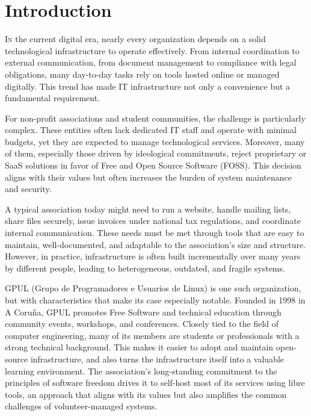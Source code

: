 %

\chapter{Introduction}
\label{chap:introducion}

\lettrine{I}{n} the current digital era, nearly every organization depends on a solid technological infrastructure to operate effectively. From internal coordination to external communication, from document management to compliance with legal obligations, many day-to-day tasks rely on tools hosted online or managed digitally. This trend has made IT infrastructure not only a convenience but a fundamental requirement.

For non-profit associations and student communities, the challenge is particularly complex. These entities often lack dedicated IT staff and operate with minimal budgets, yet they are expected to manage technological services. Moreover, many of them, especially those driven by ideological commitments, reject proprietary or SaaS solutions in favor of Free and Open Source Software (FOSS). This decision aligns with their values but often increases the burden of system maintenance and security.

A typical association today might need to run a website, handle mailing lists, share files securely, issue invoices under national tax regulations, and coordinate internal communication. These needs must be met through tools that are easy to maintain, well-documented, and adaptable to the association's size and structure. However, in practice, infrastructure is often built incrementally over many years by different people, leading to heterogeneous, outdated, and fragile systems.

GPUL (Grupo de Programadores e Usuarios de Linux) \cite{gpul_web} is one such organization, but with characteristics that make its case especially notable. Founded in 1998 in A Coruña, GPUL promotes Free Software and technical education through community events, workshops, and conferences. Closely tied to the field of computer engineering, many of its members are students or professionals with a strong technical background. This makes it easier to adopt and maintain open-source infrastructure, and also turns the infrastructure itself into a valuable learning environment. The association's long-standing commitment to the principles of software freedom drives it to self-host most of its services using libre tools, an approach that aligns with its values but also amplifies the common challenges of volunteer-managed systems.

